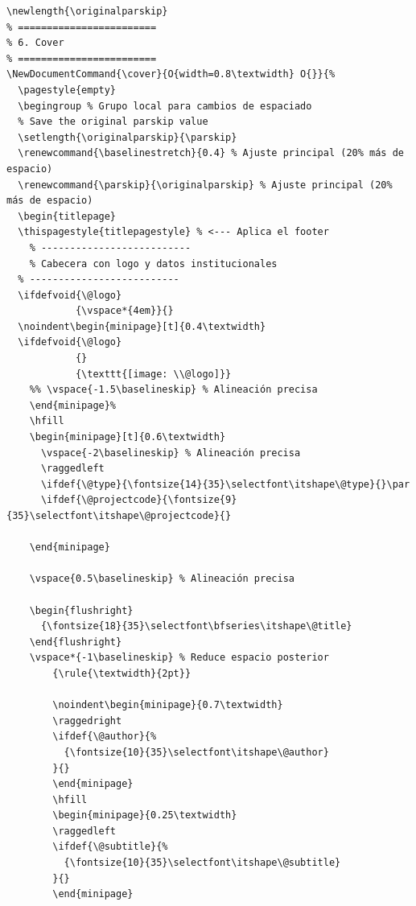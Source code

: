 \documentclass[english]{reporti}
\begin{document}
\begin{verbatim}
\newlength{\originalparskip}
% ========================
% 6. Cover
% ========================
\NewDocumentCommand{\cover}{O{width=0.8\textwidth} O{}}{%
  \pagestyle{empty}
  \begingroup % Grupo local para cambios de espaciado
  % Save the original parskip value
  \setlength{\originalparskip}{\parskip}
  \renewcommand{\baselinestretch}{0.4} % Ajuste principal (20% más de espacio)
  \renewcommand{\parskip}{\originalparskip} % Ajuste principal (20% más de espacio)
  \begin{titlepage}
  \thispagestyle{titlepagestyle} % <--- Aplica el footer
    % --------------------------
    % Cabecera con logo y datos institucionales
  % --------------------------
  \ifdefvoid{\@logo}
            {\vspace*{4em}}{}
  \noindent\begin{minipage}[t]{0.4\textwidth}
  \ifdefvoid{\@logo}
            {}
            {\texttt{[image: \\@logo]}}
    %% \vspace{-1.5\baselineskip} % Alineación precisa
    \end{minipage}%
    \hfill
    \begin{minipage}[t]{0.6\textwidth}
      \vspace{-2\baselineskip} % Alineación precisa
      \raggedleft
      \ifdef{\@type}{\fontsize{14}{35}\selectfont\itshape\@type}{}\par
      \ifdef{\@projectcode}{\fontsize{9}{35}\selectfont\itshape\@projectcode}{}

    \end{minipage}
    
    \vspace{0.5\baselineskip} % Alineación precisa

    \begin{flushright}
      {\fontsize{18}{35}\selectfont\bfseries\itshape\@title}
    \end{flushright}
    \vspace*{-1\baselineskip} % Reduce espacio posterior
        {\rule{\textwidth}{2pt}}

        \noindent\begin{minipage}{0.7\textwidth}
        \raggedright
        \ifdef{\@author}{%
          {\fontsize{10}{35}\selectfont\itshape\@author}
        }{}
        \end{minipage}
        \hfill
        \begin{minipage}{0.25\textwidth}
        \raggedleft
        \ifdef{\@subtitle}{%
          {\fontsize{10}{35}\selectfont\itshape\@subtitle}
        }{}
        \end{minipage}


\end{verbatim}
\end{document}
